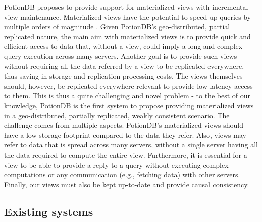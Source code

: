 PotionDB proposes to provide support for materialized views with incremental view maintenance.
Materialized views have the potential to speed up queries by multiple orders of magnitude \cite{partView, effMaintenance, lazyMaintenance}.
Given PotionDB's geo-distributed, partial replicated nature, the main aim with materialized views is to provide quick and efficient access to data that, without a view, could imply a long and complex query execution across many servers.
Another goal is to provide such views without requiring all the data referred by a view to be replicated everywhere, thus saving in storage and replication processing costs.
The views themselves should, however, be replicated everywhere relevant to provide low latency access to them.
This is thus a quite challenging and novel problem - to the best of our knowledge, PotionDB is the first system to propose providing materialized views in a geo-distributed, partially replicated, weakly consistent scenario.
The challenge comes from multiple aspects.
PotionDB's materialized views should have a low storage footprint compared to the data they refer.
Also, views may refer to data that is spread across many servers, without a single server having all the data required to compute the entire view.
Furthermore, it is essential for a view to be able to provide a reply to a query without executing complex computations or any communication (e.g., fetching data) with other servers.
Finally, our views must also be kept up-to-date and provide causal consistency.

\subsection{Existing systems}



